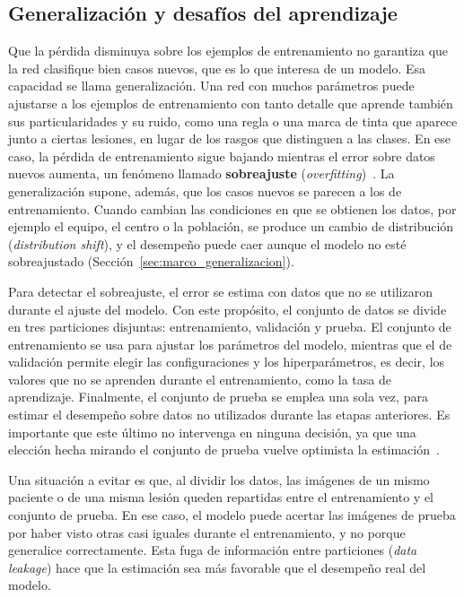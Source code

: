 \subsection{Generalización y desafíos del aprendizaje}
\label{sec:marco_regularizacion}

Que la pérdida disminuya sobre los ejemplos de entrenamiento no garantiza que la red clasifique bien casos
nuevos, que es lo que interesa de un modelo. Esa capacidad se llama generalización. Una red con muchos parámetros
puede ajustarse a los ejemplos de entrenamiento con tanto detalle que aprende también sus particularidades y su
ruido, como una regla o una marca de tinta que aparece junto a ciertas lesiones, en lugar de los rasgos que
distinguen a las clases. En ese caso, la pérdida de entrenamiento sigue bajando mientras el error sobre datos
nuevos aumenta, un fenómeno llamado \textbf{sobreajuste} (\emph{overfitting})~\cite{goodfellow2016deep}. La
generalización supone, además, que los casos nuevos se parecen a los de entrenamiento. Cuando cambian las
condiciones en que se obtienen los datos, por ejemplo el equipo, el centro o la población, se produce un cambio
de distribución (\emph{distribution shift}), y el desempeño puede caer aunque el modelo no esté sobreajustado
(Sección~\ref{sec:marco_generalizacion}).

Para detectar el sobreajuste, el error se estima con datos que no se utilizaron durante el ajuste del modelo. Con
este propósito, el conjunto de datos se divide en tres particiones disjuntas: entrenamiento, validación y prueba.
El conjunto de entrenamiento se usa para ajustar los parámetros del modelo, mientras que el de
validación permite elegir las configuraciones y los hiperparámetros, es decir, los valores que no se aprenden
durante el entrenamiento, como la tasa de aprendizaje. Finalmente, el conjunto de prueba se emplea una sola vez,
para estimar el desempeño sobre datos no utilizados durante las etapas anteriores. Es importante que este último no
intervenga en ninguna decisión, ya que una elección hecha mirando el conjunto de prueba vuelve optimista la
estimación~\cite{goodfellow2016deep}.

Una situación a evitar es que, al dividir los datos, las imágenes de un mismo paciente o de una misma lesión queden repartidas entre el
entrenamiento y el conjunto de prueba. En ese caso, el modelo puede acertar las imágenes de prueba por haber visto otras casi
iguales durante el entrenamiento, y no porque generalice correctamente. Esta fuga de información entre particiones
(\emph{data leakage}) hace que la estimación sea más favorable que el desempeño real del modelo.

